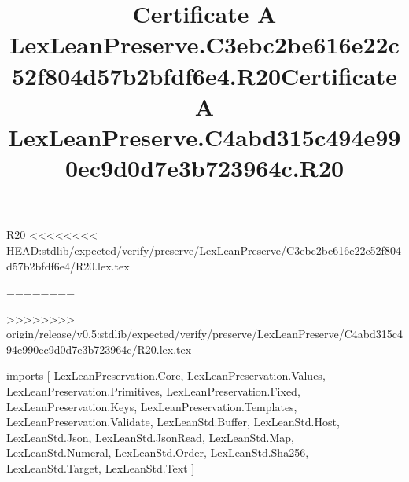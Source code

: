 \begin{lexlean}{R20}
<<<<<<<< HEAD:stdlib/expected/verify/preserve/LexLeanPreserve/C3ebc2be616e22c52f804d57b2bfdf6e4/R20.lex.tex
\title{Certificate A LexLeanPreserve.C3ebc2be616e22c52f804d57b2bfdf6e4.R20}
========
\title{Certificate A LexLeanPreserve.C4abd315c494e990ec9d0d7e3b723964c.R20}
>>>>>>>> origin/release/v0.5:stdlib/expected/verify/preserve/LexLeanPreserve/C4abd315c494e990ec9d0d7e3b723964c/R20.lex.tex
\begin{coremodule}
imports [
  LexLeanPreservation.Core,
  LexLeanPreservation.Values,
  LexLeanPreservation.Primitives,
  LexLeanPreservation.Fixed,
  LexLeanPreservation.Keys,
  LexLeanPreservation.Templates,
  LexLeanPreservation.Validate,
  LexLeanStd.Buffer,
  LexLeanStd.Host,
  LexLeanStd.Json,
  LexLeanStd.JsonRead,
  LexLeanStd.Map,
  LexLeanStd.Numeral,
  LexLeanStd.Order,
  LexLeanStd.Sha256,
  LexLeanStd.Target,
  LexLeanStd.Text
]


\end{coremodule}
\end{lexlean}
